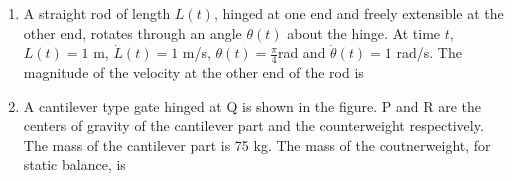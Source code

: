 \documentclass[journal,12pt,onecolumn]{IEEEtran}
\begin{document}
\begin{enumerate}
    \item A straight rod of length $L(t)$, hinged at one end and freely extensible at the other end, rotates through an angle $\theta(t)$ about the hinge. At time $t$, $L(t)=1$ m, $\dot{L}(t)=1$ m/s, $\theta(t)=\frac{\pi}{4}$rad and $\dot{\theta}(t)=1$ rad/s. The magnitude of the velocity at the other end of the rod is
          \begin{enumerate}
          \end{enumerate}

    \item A cantilever type gate hinged at Q is shown in the figure. P and R are the centers of gravity of the cantilever part and the counterweight respectively. The mass of the cantilever part is 75 kg. The mass of the coutnerweight, for static balance, is
          \begin{figure}[H]
              \centering
              \caption{}
              \label{q10}
          \end{figure}

          \begin{enumerate}
          \end{enumerate}


\end{enumerate}
\end{document}
